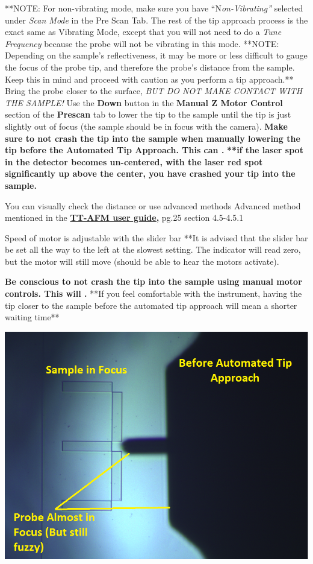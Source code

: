 \documentclass{../lab}
\begin{document}
**NOTE: For non-vibrating mode, make sure you have ``N\emph{on-Vibrating''} selected under \emph{Scan Mode} in the Pre Scan Tab.  The rest of the tip approach process is the exact same as Vibrating Mode, except that you will not need to do a \emph{Tune Frequency} because the probe will not be vibrating in this mode.
**NOTE: Depending on the sample's reflectiveness, it may be more or less difficult to gauge the focus of the probe tip, and therefore the probe's distance from the sample. Keep this in mind and proceed with caution as you perform a tip approach.**
Bring the probe closer to the surface, \emph{BUT DO NOT MAKE CONTACT WITH THE SAMPLE!} Use the \textbf{Down} button in the \textbf{Manual Z Motor Control} section of the \textbf{Prescan }tab to lower the tip to the sample until the tip is just slightly out of focus (the sample should be in focus with the camera).
\textbf{Make sure to not crash the tip into the sample when manually lowering the tip before the Automated Tip Approach. This can .}
\textbf{**if the laser spot in the detector becomes un-centered, with the laser red spot significantly up above the center, you have crashed your tip into the sample.}


You can visually check the distance or use advanced methods
Advanced method mentioned in the \href{http://experimentationlab.berkeley.edu/tt-afmuserguidev2.2}{\textbf{TT-AFM user guide,}} pg.25 section 4.5-4.5.1

Speed of motor is adjustable with the slider bar
**It is advised that the slider bar be set all the way to the left at the slowest setting.  The indicator will read zero, but the motor will still move (should be able to hear the motors activate).

\textbf{Be conscious to not crash the tip into the sample using manual motor controls. This will .}
**If you feel comfortable with the instrument, having the tip closer to the sample before the automated tip approach will mean a shorter waiting time**


\begin{center}
    \href{http://experimentationlab.berkeley.edu/sites/default/files/AFMImages/probe_unfocused2_0.png}{\includegraphics[width=0.5\linewidth]{images/probe_unfocused2_0.png}}
\end{center}
\end{document}
